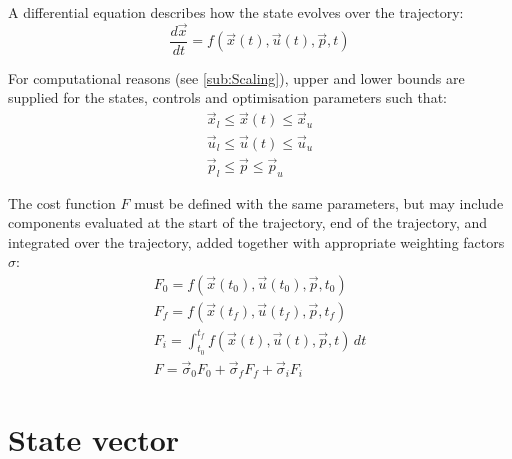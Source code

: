 A differential equation describes how the state evolves over the trajectory:
\begin{equation}\label{eq:generic-DE}
\frac{d\vec{x}}{dt} = f(\vec{x}(t),\vec{u}(t),\vec{p},t)
\end{equation}

For computational reasons (see \autoref{sub:Scaling}), upper and lower bounds are supplied for the states, controls and optimisation parameters such that:
\begin{gather}
\vec{x}_l\le\vec{x}(t)\le\vec{x}_u \label{eq:state-bounds}\\
\vec{u}_l\le\vec{u}(t)\le\vec{u}_u \label{eq:control-bounds}\\
\vec{p}_l\le\vec{p}\le\vec{p}_u \label{eq:parameter-bounds}
\end{gather}

The cost function $F$ must be defined with the same parameters, but may include components evaluated at the start of the trajectory, end of the trajectory, and integrated over the trajectory, added together with appropriate weighting factors $\sigma$:
\begin{gather}
F_0=f(\vec{x}(t_0),\vec{u}(t_0),\vec{p},t_0) \label{eq:init-cost}\\
F_f=f(\vec{x}(t_f),\vec{u}(t_f),\vec{p},t_f) \label{eq:final-cost}\\
F_i=\int^{t_f}_{t_0}f(\vec{x}(t),\vec{u}(t),\vec{p},t)\,dt \label{eq:integral-cost} \\
F = \vec\sigma_0 F_0+\vec\sigma_f F_f+\vec\sigma_i F_i \label{eq:total-cost}
\end{gather}

\section{State vector} \label{sec:state-vector}

